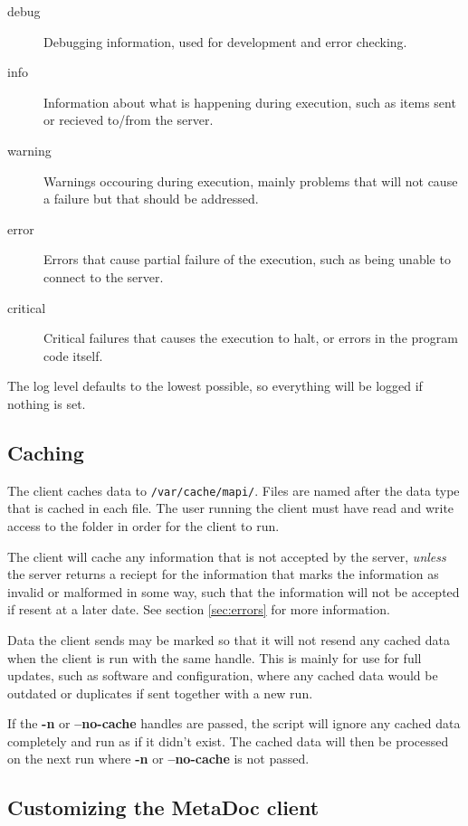 \begin{description}
    \item[debug]    Debugging information, used for development and error
    checking.
    \item[info] Information about what is happening during execution, such as
    items sent or recieved to/from the server.
    \item[warning]  Warnings occouring during execution, mainly problems that
    will not cause a failure but that should be addressed.
    \item[error]    Errors that cause partial failure of the execution, such as
    being unable to connect to the server.
    \item[critical] Critical failures that causes the execution to halt, or
    errors in the program code itself.
\end{description}

The log level defaults to the lowest possible, so everything will be logged if
nothing is set.

\subsection{Caching}
\label{sec:caching}
The client caches data to \texttt{/var/cache/mapi/}. Files are named after the
data type that is cached in each file. The user running the client must have
read and write access to the folder in order for the client to run. 

The client will cache any information that is not accepted by the server, 
\textit{unless} the server returns a reciept for the information that marks the 
information as invalid or malformed in some way, such that the information will 
not be accepted if resent at a later date. See section \ref{sec:errors} for
more information.

Data the client sends may be marked so that it will not resend any cached data
when the client is run with the same handle. This is mainly for use for full
updates, such as software and configuration, where any cached data would be
outdated or duplicates if sent together with a new run.

If the \textbf{-n} or \textbf{--no-cache} handles are passed, the script will
ignore any cached data completely and run as if it didn't exist. The cached
data will then be processed on the next run where \textbf{-n} or
\textbf{--no-cache} is not passed.

\subsection{Customizing the MetaDoc client}
\label{sec:customizing_client}


